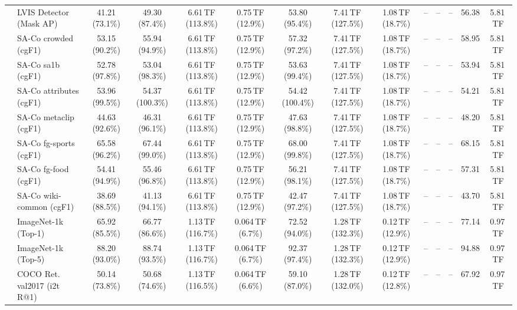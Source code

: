 \begin{table}[t]
\begin{center}
\begin{small}
\begin{sc}
{\begin{tabular}{llcccccccccccc}
& LVIS Detector (Mask AP) & 41.21 (73.1\%) & 49.30 (87.4\%) & 6.61\,TF (113.8\%) & 0.75\,TF (12.9\%) & 53.80 (95.4\%) & 7.41\,TF (127.5\%) & 1.08\,TF (18.7\%) & -- & -- & -- & 56.38 & 5.81\,TF \\
& SA-Co crowded (cgF1) & 53.15 (90.2\%) & 55.94 (94.9\%) & 6.61\,TF (113.8\%) & 0.75\,TF (12.9\%) & 57.32 (97.2\%) & 7.41\,TF (127.5\%) & 1.08\,TF (18.7\%) & -- & -- & -- & 58.95 & 5.81\,TF \\
& SA-Co sa1b (cgF1) & 52.78 (97.8\%) & 53.04 (98.3\%) & 6.61\,TF (113.8\%) & 0.75\,TF (12.9\%) & 53.63 (99.4\%) & 7.41\,TF (127.5\%) & 1.08\,TF (18.7\%) & -- & -- & -- & 53.94 & 5.81\,TF \\
& SA-Co attributes (cgF1) & 53.96 (99.5\%) & 54.37 (100.3\%) & 6.61\,TF (113.8\%) & 0.75\,TF (12.9\%) & 54.42 (100.4\%) & 7.41\,TF (127.5\%) & 1.08\,TF (18.7\%) & -- & -- & -- & 54.21 & 5.81\,TF \\
& SA-Co metaclip (cgF1) & 44.63 (92.6\%) & 46.31 (96.1\%) & 6.61\,TF (113.8\%) & 0.75\,TF (12.9\%) & 47.63 (98.8\%) & 7.41\,TF (127.5\%) & 1.08\,TF (18.7\%) & -- & -- & -- & 48.20 & 5.81\,TF \\
& SA-Co fg-sports (cgF1) & 65.58 (96.2\%) & 67.44 (99.0\%) & 6.61\,TF (113.8\%) & 0.75\,TF (12.9\%) & 68.00 (99.8\%) & 7.41\,TF (127.5\%) & 1.08\,TF (18.7\%) & -- & -- & -- & 68.15 & 5.81\,TF \\
& SA-Co fg-food (cgF1) & 54.41 (94.9\%) & 55.46 (96.8\%) & 6.61\,TF (113.8\%) & 0.75\,TF (12.9\%) & 56.21 (98.1\%) & 7.41\,TF (127.5\%) & 1.08\,TF (18.7\%) & -- & -- & -- & 57.31 & 5.81\,TF \\
& SA-Co wiki-common (cgF1) & 38.69 (88.5\%) & 41.13 (94.1\%) & 6.61\,TF (113.8\%) & 0.75\,TF (12.9\%) & 42.47 (97.2\%) & 7.41\,TF (127.5\%) & 1.08\,TF (18.7\%) & -- & -- & -- & 43.70 & 5.81\,TF \\
\midrule
{}
& ImageNet-1k (Top-1) & 65.92 (85.5\%) & 66.77 (86.6\%) & 1.13\,TF (116.7\%) & 0.064\,TF (6.7\%) & 72.52 (94.0\%) & 1.28\,TF (132.3\%) & 0.12\,TF (12.9\%) & -- & -- & -- & 77.14 & 0.97\,TF \\
& ImageNet-1k (Top-5) & 88.20 (93.0\%) & 88.74 (93.5\%) & 1.13\,TF (116.7\%) & 0.064\,TF (6.7\%) & 92.37 (97.4\%) & 1.28\,TF (132.3\%) & 0.12\,TF (12.9\%) & -- & -- & -- & 94.88 & 0.97\,TF \\
& COCO Ret. val2017 (i2t R@1) & 50.14 (73.8\%) & 50.68 (74.6\%) & 1.13\,TF (116.5\%) & 0.064\,TF (6.6\%) & 59.10 (87.0\%) & 1.28\,TF (132.0\%) & 0.12\,TF (12.8\%) & -- & -- & -- & 67.92 & 0.97\,TF \\

\end{tabular}}
\end{sc}
\end{small}
\end{center}
\end{table}
